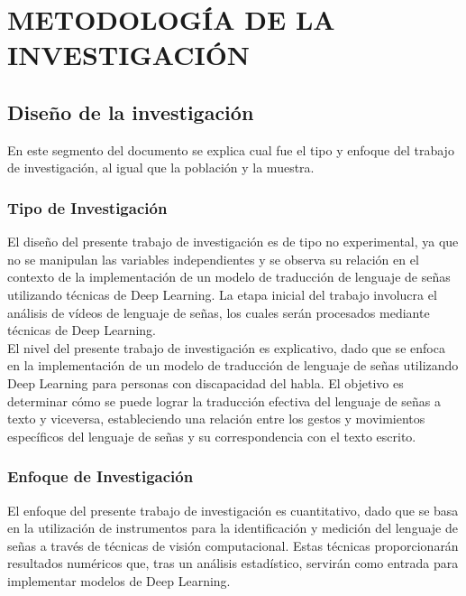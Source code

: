 \chapter{METODOLOGÍA DE LA INVESTIGACIÓN}
\section{Diseño de la investigación}

En este segmento del documento se explica cual fue el tipo y enfoque del trabajo de
investigación, al igual que la población y la muestra. 

\subsection{Tipo de Investigación}
El diseño del presente trabajo de investigación es de tipo no experimental, ya que no se manipulan las variables independientes y se observa su relación en el contexto de la implementación de un modelo de traducción de lenguaje de señas utilizando técnicas de Deep Learning. La etapa inicial del trabajo involucra el análisis de vídeos de lenguaje de señas, los cuales serán procesados mediante técnicas de Deep Learning. \\

El nivel del presente trabajo de investigación es explicativo, dado que se enfoca en la implementación de un modelo de traducción de lenguaje de señas utilizando Deep Learning para personas con discapacidad del habla. El objetivo es determinar cómo se puede lograr la traducción efectiva del lenguaje de señas a texto y viceversa, estableciendo una relación entre los gestos y movimientos específicos del lenguaje de señas y su correspondencia con el texto escrito. \\



\subsection{Enfoque de Investigación}

El enfoque del presente trabajo de investigación es cuantitativo, dado que se basa en la utilización de instrumentos para la identificación y medición del lenguaje de señas a través de técnicas de visión computacional. Estas técnicas proporcionarán resultados numéricos que, tras un análisis estadístico, servirán como entrada para implementar modelos de Deep Learning. 



